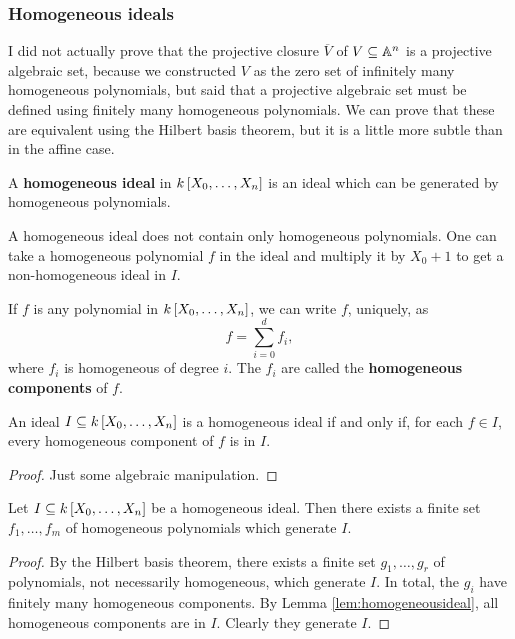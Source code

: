 \subsubsection{Homogeneous ideals}

I did not actually prove that the projective closure $ \overline{V} $ of $ V \subseteq \AA^n $ is a projective algebraic set, because we constructed $ V $ as the zero set of infinitely many homogeneous polynomials, but said that a projective algebraic set must be defined using finitely many homogeneous polynomials. We can prove that these are equivalent using the Hilbert basis theorem, but it is a little more subtle than in the affine case.

\begin{definition*}
A \textbf{homogeneous ideal} in $ k\sbr{X_0, \dots, X_n} $ is an ideal which can be generated by homogeneous polynomials.
\end{definition*}

\begin{note*}
A homogeneous ideal does not contain only homogeneous polynomials. One can take a homogeneous polynomial $ f $ in the ideal and multiply it by $ X_0 + 1 $ to get a non-homogeneous ideal in $ I $.
\end{note*}

If $ f $ is any polynomial in $ k\sbr{X_0, \dots, X_n} $, we can write $ f $, uniquely, as
$$ f = \sum_{i = 0}^d f_i, $$
where $ f_i $ is homogeneous of degree $ i $. The $ f_i $ are called the \textbf{homogeneous components} of $ f $.

\begin{lemma}
\label{lem:homogeneousideal}
An ideal $ I \subseteq k\sbr{X_0, \dots, X_n} $ is a homogeneous ideal if and only if, for each $ f \in I $, every homogeneous component of $ f $ is in $ I $.
\end{lemma}

\begin{proof}
Just some algebraic manipulation.
\end{proof}

\begin{proposition}
\label{prop:homogeneousideal}
Let $ I \subseteq k\sbr{X_0, \dots, X_n} $ be a homogeneous ideal. Then there exists a finite set $ f_1, \dots, f_m $ of homogeneous polynomials which generate $ I $.
\end{proposition}

\begin{proof}
By the Hilbert basis theorem, there exists a finite set $ g_1, \dots, g_r $ of polynomials, not necessarily homogeneous, which generate $ I $. In total, the $ g_i $ have finitely many homogeneous components. By Lemma \ref{lem:homogeneousideal}, all homogeneous components are in $ I $. Clearly they generate $ I $.
\end{proof}

